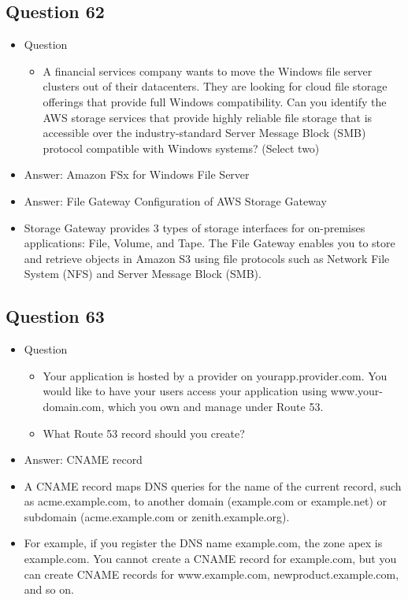 \documentclass[]{scrartcl}
\begin{document}
\subsection{Question 62}
\begin{itemize}
	\item Question
	\begin{itemize}
		\item A financial services company wants to move the Windows file server clusters out of their datacenters. They are looking for cloud file storage offerings that provide full Windows compatibility. Can you identify the AWS storage services that provide highly reliable file storage that is accessible over the industry-standard Server Message Block (SMB) protocol compatible with Windows systems? (Select two)
	\end{itemize}
	\item Answer: Amazon FSx for Windows File Server
	\item Answer: File Gateway Configuration of AWS Storage Gateway
	\item Storage Gateway provides 3 types of storage interfaces for on-premises applications: File, Volume, and Tape. The File Gateway enables you to store and retrieve objects in Amazon S3 using file protocols such as Network File System (NFS) and Server Message Block (SMB).
\end{itemize}

\subsection{Question 63}
\begin{itemize}
	\item Question
	\begin{itemize}
		\item Your application is hosted by a provider on yourapp.provider.com. You would like to have your users access your application using www.your-domain.com, which you own and manage under Route 53.
		\item What Route 53 record should you create?
	\end{itemize}
	\item Answer: CNAME record
	\item A CNAME record maps DNS queries for the name of the current record, such as acme.example.com, to another domain (example.com or example.net) or subdomain (acme.example.com or zenith.example.org).
	\item For example, if you register the DNS name example.com, the zone apex is example.com. You cannot create a CNAME record for example.com, but you can create CNAME records for www.example.com, newproduct.example.com, and so on.
\end{itemize}
\end{document}

